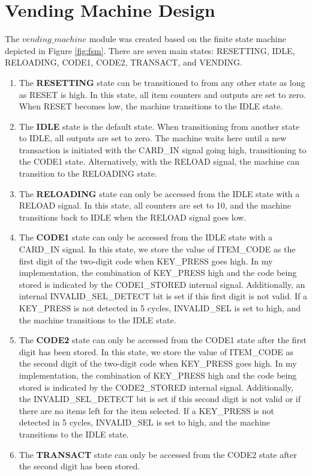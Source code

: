 \documentclass{article}
\begin{document}
\section{Vending Machine Design}
The $vending\_machine$ module was created based on the finite state machine depicted in Figure \ref{fig:fsm}. There are seven main states: RESETTING, IDLE, RELOADING, CODE1, CODE2, TRANSACT, and VENDING.

\begin{enumerate}
    \item The \textbf{RESETTING} state can be transitioned to from any other state as long as RESET is high. In this state, all item counters and outputs are set to zero. When RESET becomes low, the machine transitions to the IDLE state.
    \item The \textbf{IDLE} state is the default state. When transitioning from another state to IDLE, all outputs are set to zero. The machine waits here until a new transaction is initiated with the CARD\_IN signal going high, transitioning to the CODE1 state. Alternatively, with the RELOAD signal, the machine can transition to the RELOADING state.
    \item The \textbf{RELOADING} state can only be accessed from the IDLE state with a RELOAD signal. In this state, all counters are set to 10, and the machine transitions back to IDLE when the RELOAD signal goes low.
    \item The \textbf{CODE1} state can only be accessed from the IDLE state with a CARD\_IN signal. In this state, we store the value of ITEM\_CODE as the first digit of the two-digit code when KEY\_PRESS goes high. In my implementation, the combination of KEY\_PRESS high and the code being stored is indicated by the CODE1\_STORED internal signal. Additionally, an internal INVALID\_SEL\_DETECT bit is set if this first digit is not valid. If a KEY\_PRESS is not detected in 5 cycles, INVALID\_SEL is set to high, and the machine transitions to the IDLE state.
    \item The \textbf{CODE2} state can only be accessed from the CODE1 state after the first digit has been stored. In this state, we store the value of ITEM\_CODE as the second digit of the two-digit code when KEY\_PRESS goes high. In my implementation, the combination of KEY\_PRESS high and the code being stored is indicated by the CODE2\_STORED internal signal. Additionally, the INVALID\_SEL\_DETECT bit is set if this second digit is not valid or if there are no items left for the item selected. If a KEY\_PRESS is not detected in 5 cycles, INVALID\_SEL is set to high, and the machine transitions to the IDLE state.
    \item The \textbf{TRANSACT} state can only be accessed from the CODE2 state after the second digit has been stored. 
    

\end{enumerate}
\end{document}
